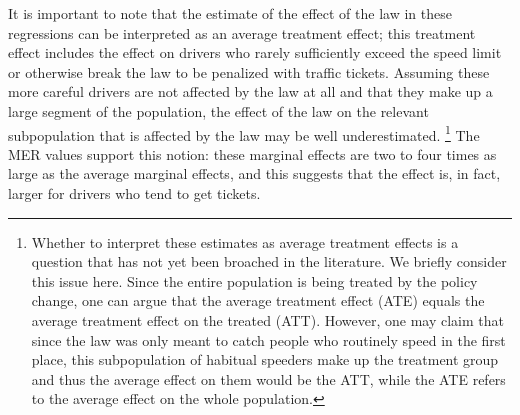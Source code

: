 % 
%

It is important to note that the estimate of the effect of the law in these regressions 
can be interpreted as an average treatment effect; 
this treatment effect includes the effect on drivers 
who rarely sufficiently exceed the speed limit 
or otherwise break the law to be penalized with traffic tickets. 
Assuming these more careful drivers are not affected by the law at all 
and that they make up a large segment of the population, 
the effect of the law on the relevant subpopulation that is affected by the law 
may be well underestimated.%
\footnote{%
Whether to interpret these estimates as average treatment effects 
is a question that has not yet been broached in the literature. 
We briefly consider this issue here. 
Since the entire population is being treated by the policy change, 
one can argue that the average treatment effect (ATE) equals 
the average treatment effect on the treated (ATT). 
However, one may claim that since the law was only meant to catch people 
who routinely speed in the first place, 
this subpopulation of habitual speeders make up the treatment group 
and thus the average effect on them would be the ATT, 
while the ATE refers to the average effect on the whole population.
}
%
The MER values support this notion: 
these marginal effects are two to four times as large as the average marginal effects, 
and this suggests that the effect is, in fact, larger for drivers who tend to get tickets.

